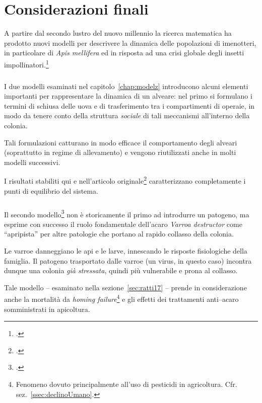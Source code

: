 \chapter{Considerazioni finali}
A partire dal secondo lustro del nuovo millennio la ricerca matematica ha prodotto nuovi modelli per
descrivere la dinamica delle popolazioni di imenotteri, in particolare di \emph{Apis mellifera} ed in risposta
ad una crisi globale degli insetti impollinatori.\footcite{chen_review,decline}

\paragraph{}
I due modelli esaminati nel capitolo~\ref{chap:modelz} introducono alcuni elementi importanti per rappresentare
la dinamica di un alveare: nel primo si formulano i termini di schiusa delle uova e di
trasferimento tra i compartimenti di operaie, in modo da tenere conto della struttura \emph{sociale} di tali meccanismi
all'interno della colonia.

Tali formulazioni catturano in modo efficace il comportamento degli alveari (soprattutto in regime di allevamento)
e vengono riutilizzati anche in molti modelli successivi.

I risultati stabiliti qui e nell'articolo originale\footcite{khoury2011} caratterizzano
completamente i punti di equilibrio del sistema.

\paragraph{}
Il secondo modello\footcite{ratti2017} non è storicamente il primo ad introdurre un patogeno, ma esprime con successo
il ruolo fondamentale dell'acaro \emph{Varroa destructor} come ``apripista'' per altre patologie che portano
al rapido collasso della colonia.

Le varroe danneggiano le api e le larve, innescando le risposte fisiologiche della famiglia. Il patogeno
trasportato dalle varroe (un virus, in questo caso) incontra dunque una colonia \emph{già stressata},
quindi più vulnerabile e prona al collasso.

Tale modello -- esaminato nella sezione~\ref{sec:ratti17} -- prende in considerazione anche la mortalità da
\emph{homing failure}\footnote{Fenomeno dovuto principalmente all'uso di
pesticidi in agricoltura. Cfr. sez.~\ref{ssec:declinoUmano}.}
e gli effetti dei trattamenti anti--acaro somministrati in apicoltura.


